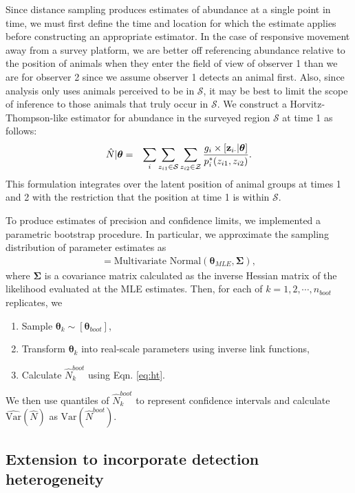 \documentclass[aoas,preprint]{imsart}
\numberwithin{equation}{section}
\theoremstyle{plain}
\begin{document}
Since distance sampling produces estimates of abundance at a single point in time, we must first define the time and location for which the estimate applies before constructing an appropriate estimator.  In the case of responsive movement away from a survey platform, we are better off referencing abundance relative to the position of animals when they enter the field of view of observer 1 than we are for observer 2 since we assume observer 1 detects an animal first.  Also, since analysis only uses animals perceived to be in $\mathcal{S}$, it may be best to limit the scope of inference to those animals that truly occur in $\mathcal{S}$.  We construct a Horvitz-Thompson-like estimator for abundance in the surveyed region $\mathcal{S}$ at time 1 as follows:
\begin{eqnarray}
  \hat{N}|\boldsymbol{\theta} & = & \sum_i \sum_{z_{i1} \in \mathcal{S}} \sum_{z_{i2} \in \mathcal{Z}} \frac{g_i \times [{\bf z}_{i \cdot} | \boldsymbol{\theta}]}{p_i^*(z_{i1},z_{i2})}.
  \label{eq:ht}
\end{eqnarray}
This formulation integrates over the latent position of animal groups at times 1 and 2 with the restriction that the position at time 1 is within $\mathcal{S}$.

To produce estimates of precision and confidence limits, we implemented a parametric bootstrap procedure. In particular, we approximate the sampling distribution of parameter estimates as
\begin{eqnarray*}
  [\boldsymbol{\theta}_{boot}] = \text{Multivariate Normal}(\boldsymbol{\theta}_{MLE},\boldsymbol{\Sigma}),
\end{eqnarray*}
where $\boldsymbol{\Sigma}$ is a covariance matrix calculated as the inverse Hessian matrix of the likelihood evaluated at the MLE estimates. Then, for each of $k = 1, 2, \cdots, n_{boot}$ replicates, we
\begin{enumerate}
  \item Sample $\boldsymbol{\theta}_k \sim [\boldsymbol{\theta}_{boot}]$,
  \item Transform $\boldsymbol{\theta}_k$ into real-scale parameters using inverse link functions,
  \item Calculate $\hat{N}_k^{boot}$ using Eqn. \ref{eq:ht}.
\end{enumerate}
We then use quantiles of $\hat{N}_k^{boot}$ to represent confidence intervals and calculate $\hat{\text{Var}}(\hat{N})$ as $\text{Var}(\hat{N}^{boot})$.

\subsection{Extension to incorporate detection heterogeneity}
\end{document}
